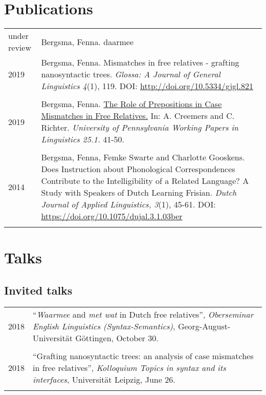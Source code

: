 \documentclass[12pt]{article}
\begin{document}
\section{Publications}
\begin{tabular}{p{3cm}l}
under review & Bergsma, Fenna. daarmee\\


2019 & Bergsma, Fenna. Mismatches in free relatives - grafting nanosyntactic trees. \emph{Glossa: A Journal of General Linguistics 4}(1), 119. DOI: \href{http://doi.org/10.5334/gjgl.821}{http://doi.org/10.5334/gjgl.821}\\&\\
2019 & Bergsma, Fenna. \href{https://repository.upenn.edu/pwpl/vol25/iss1/6}{The Role of Prepositions in Case Mismatches in Free Relatives.} In: A. Creemers and C. Richter.\textit{ University of Pennsylvania Working Papers in Linguistics 25.1.} 41-50. \\&\\
2014 & Bergsma, Fenna, Femke Swarte and Charlotte Gooskens. Does Instruction about Phonological Correspondences Contribute to the Intelligibility of a Related Language? A Study with Speakers of Dutch Learning Frisian. \emph{Dutch Journal of Applied Linguistics, 3}(1), 45-61. DOI: \href{https://doi.org/10.1075/dujal.3.1.03ber}{https://doi.org/10.1075/dujal.3.1.03ber}\\&\\
\end{tabular}

\section{Talks}

\subsection{Invited talks}
\begin{tabular}{p{3cm}l}
2018 & ``\emph{Waarmee} and \emph{met wat} in Dutch free relatives'', \emph{Oberseminar English Linguistics (Syntax-Semantics)}, Georg-August-Universität Göttingen, October 30.\\&\\
2018 & ``Grafting nanosyntactic trees: an analysis of case mismatches in free relatives'', \emph{Kolloquium Topics in syntax and its interfaces}, Universität Leipzig,  June 26.\\&\\
\end{tabular}
\end{document}
